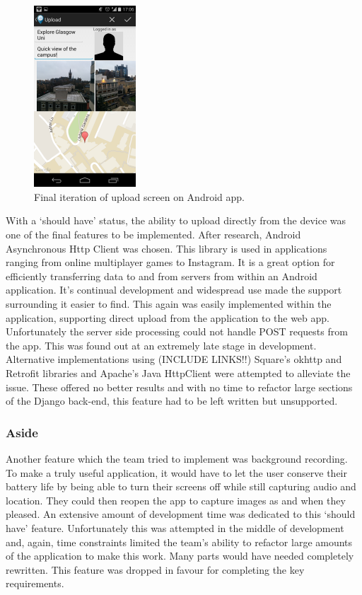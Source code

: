 \documentclass{l3proj}
\begin{document}
\begin{figure}[ht!]
\centering
\includegraphics[width=0.34\textwidth]{images/final-upload-screen.png}
\caption{Final iteration of upload screen on Android app.}
\end{figure}

With a ‘should have’ status, the ability to upload directly from the device was one of the final features to be implemented. After research, Android Asynchronous Http Client was chosen. This library is used in applications ranging from online multiplayer games to Instagram. It is a great option for efficiently transferring data to and from servers from within an Android application. It's continual development and widespread use made the support surrounding it easier to find. This again was easily implemented within the application, supporting direct upload from the application to the web app. Unfortunately the server side processing could not handle POST requests from the app. This was found out at an extremely late stage in development. Alternative implementations using (INCLUDE LINKS!!) Square's okhttp and Retrofit libraries and Apache’s Java HttpClient were attempted to alleviate the issue. These offered no better results and with no time to refactor large sections of the \gls{Django} back-end, this feature had to be left written but unsupported.

\subsubsection{Aside}
Another feature which the team tried to implement was background recording. To make a truly useful application, it would have to let the user conserve their battery life by being able to turn their screens off while still capturing audio and location. They could then reopen the app to capture images as and when they pleased. An extensive amount of development time was dedicated to this ‘should have’ feature. Unfortunately this was attempted in the middle of development and, again, time constraints limited the team's ability to refactor large amounts of the application to make this work. Many parts would have needed completely rewritten. This feature was dropped in favour for completing the key requirements.
\end{document}
